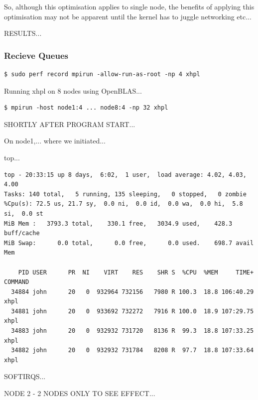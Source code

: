 \documentclass{report}
\begin{document}
So, although this optimisation applies to  single node, the benefits of applying this optimisation may not be apparent until the kernel has to juggle networking etc...

RESULTS...


%
%
\subsubsection{Recieve Queues}

\lstset{style=type}
\begin{lstlisting}
$ sudo perf record mpirun -allow-run-as-root -np 4 xhpl
\end{lstlisting}



Running xhpl on 8 nodes using OpenBLAS...

\lstset{style=type}
\begin{lstlisting}
$ mpirun -host node1:4 ... node8:4 -np 32 xhpl
\end{lstlisting}


SHORTLY AFTER PROGRAM START...

On node1,... where we initiated...

top...

\lstset{style=type}
\begin{lstlisting}
top - 20:33:15 up 8 days,  6:02,  1 user,  load average: 4.02, 4.03, 4.00
Tasks: 140 total,   5 running, 135 sleeping,   0 stopped,   0 zombie
%Cpu(s): 72.5 us, 21.7 sy,  0.0 ni,  0.0 id,  0.0 wa,  0.0 hi,  5.8 si,  0.0 st
MiB Mem :   3793.3 total,    330.1 free,   3034.9 used,    428.3 buff/cache
MiB Swap:      0.0 total,      0.0 free,      0.0 used.    698.7 avail Mem 

    PID USER      PR  NI    VIRT    RES    SHR S  %CPU  %MEM     TIME+ COMMAND                                                   
  34884 john      20   0  932964 732156   7980 R 100.3  18.8 106:40.29 xhpl                                                      
  34881 john      20   0  933692 732272   7916 R 100.0  18.9 107:29.75 xhpl                                                      
  34883 john      20   0  932932 731720   8136 R  99.3  18.8 107:33.25 xhpl                                                      
  34882 john      20   0  932932 731784   8208 R  97.7  18.8 107:33.64 xhpl                                                      
\end{lstlisting}

SOFTIRQS...


NODE 2 - 2 NODES ONLY TO SEE EFFECT...
\end{document}
